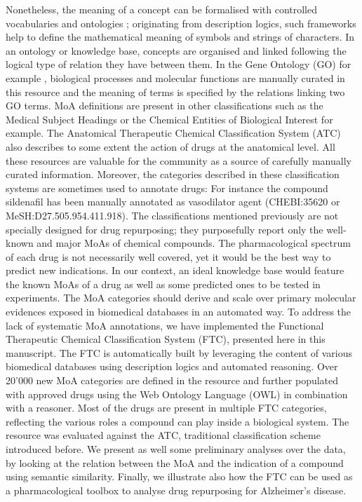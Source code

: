 \documentclass{bioinfo}
\begin{document}
Nonetheless, the meaning of a concept can be formalised with controlled vocabularies and ontologies \citep{Gruber1995}; 
originating from description logics, such frameworks help to define the mathematical meaning of symbols and strings of characters. 
In an ontology or knowledge base, concepts are organised and linked following the logical type of relation they have between them. 
In the Gene Ontology (GO) for example \citep{Ashburner2000}, biological processes and molecular functions are manually curated in this resource 
and the meaning of terms is specified by the relations linking two GO terms.
MoA definitions are present in other classifications such as the Medical Subject Headings \citep{Nelson2004} or the Chemical Entities of 
Biological Interest \citep{Hastings2012} for example. The Anatomical Therapeutic 
Chemical Classification System (ATC) \citep{world2000anatomical} also describes to some 
extent the action of drugs at the anatomical level. All these resources are valuable for the community as a source of carefully 
manually curated information. Moreover, the categories described in these classification systems are sometimes used to annotate 
drugs: For instance the compound sildenafil has been manually annotated as vasodilator agent (CHEBI:35620 or MeSH:D27.505.954.411.918).
The classifications mentioned previously are not specially designed for drug repurposing; they purposefully report only the 
well-known and major MoAs of chemical compounds. The pharmacological spectrum of each drug is not necessarily well covered, yet 
it would be the best way to predict new indications. In our context, an ideal knowledge base would feature the known MoAs of a 
drug as well as some predicted ones to be tested in experiments. The MoA categories should derive and scale over primary molecular 
evidences exposed in biomedical databases in an automated way.
To address the lack of systematic MoA annotations, we have implemented the Functional Therapeutic Chemical 
Classification System (FTC), presented here in this manuscript. The FTC is automatically built by leveraging the content 
of various biomedical databases using description logics and automated reasoning. Over 20'000 new MoA categories are defined 
in the resource and further populated with approved drugs using the Web Ontology Language (OWL) in combination with a reasoner. 
Most of the drugs are present in multiple FTC categories, reflecting the various roles a compound can play inside a biological system. 
The resource was evaluated against the ATC, traditional classification scheme introduced before. We present as well some preliminary 
analyses over the data, by looking at the relation between the MoA and the indication of a compound using semantic similarity. 
Finally, we illustrate also how the FTC can be used as a pharmacological toolbox to analyse drug repurposing for Alzheimer’s disease.
\end{document}
